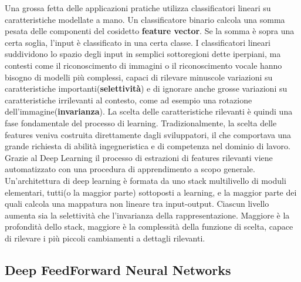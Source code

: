 Una grossa fetta delle applicazioni pratiche utilizza classificatori lineari su caratteristiche modellate a mano. 
Un classificatore binario calcola una somma pesata delle componenti del cosidetto \textbf{feature vector}. Se la somma è sopra una certa soglia, 
l'input è classificato in una certa classe. I classificatori lineari suddividono lo spazio degli input in semplici sottoregioni dette iperpiani, ma contesti come il riconoscimento di immagini o il riconoscimento vocale hanno
bisogno di modelli più complessi, capaci di rilevare  minuscole variazioni su caratteristiche importanti(\textbf{selettività}) e di ignorare anche grosse variazioni su caratteristiche irrilevanti al contesto, come ad esempio una rotazione dell'immagine(\textbf{invarianza}). La scelta delle caratteristiche rilevanti è quindi una
fase fondamentale del processo di learning. Tradizionalmente, la scelta delle features veniva costruita direttamente dagli sviluppatori, il che comportava una grande richiesta di abilità ingegneristica e di competenza nel dominio di lavoro.
Grazie al Deep  Learning  il processo di estrazioni di features rilevanti viene automatizzato con una procedura di apprendimento a scopo generale.
Un'architettura di deep learning è formata da uno stack multilivello di moduli elementari, tutti(o la maggior parte) sottoposti a learning, e la maggior parte dei quali
calcola una mappatura non lineare tra input-output. Ciascun livello aumenta sia la selettività che l'invarianza della rappresentazione. 
Maggiore è la profondità dello stack, maggiore è la complessità della funzione di scelta, capace di rilevare i più piccoli cambiamenti a dettagli rilevanti\cite{deep}.

\subsection{Deep FeedForward Neural Networks}

